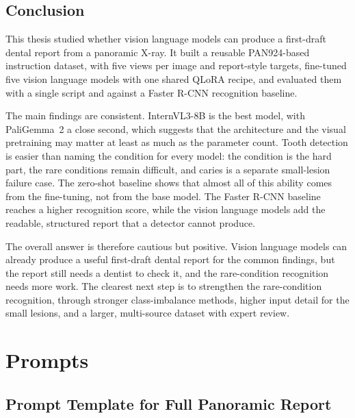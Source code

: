 \documentclass[a4paper,12pt]{report}
\begin{document}
\section{Conclusion}

This thesis studied whether vision language models can produce a first-draft dental report from a panoramic X-ray. It built a reusable PAN924-based instruction dataset, with five views per image and report-style targets, fine-tuned five vision language models with one shared QLoRA recipe, and evaluated them with a single script and against a Faster R-CNN recognition baseline.

The main findings are consistent. InternVL3-8B is the best model, with PaliGemma~2 a close second, which suggests that the architecture and the visual pretraining may matter at least as much as the parameter count. Tooth detection is easier than naming the condition for every model: the condition is the hard part, the rare conditions remain difficult, and caries is a separate small-lesion failure case. The zero-shot baseline shows that almost all of this ability comes from the fine-tuning, not from the base model. The Faster R-CNN baseline reaches a higher recognition score, while the vision language models add the readable, structured report that a detector cannot produce.

The overall answer is therefore cautious but positive. Vision language models can already produce a useful first-draft dental report for the common findings, but the report still needs a dentist to check it, and the rare-condition recognition needs more work. The clearest next step is to strengthen the rare-condition recognition, through stronger class-imbalance methods, higher input detail for the small lesions, and a larger, multi-source dataset with expert review.

\appendix
\chapter{Prompts}\label{app:prompts}

\section*{Prompt Template for Full Panoramic Report}\label{app:full-report-prompt}
\end{document}
